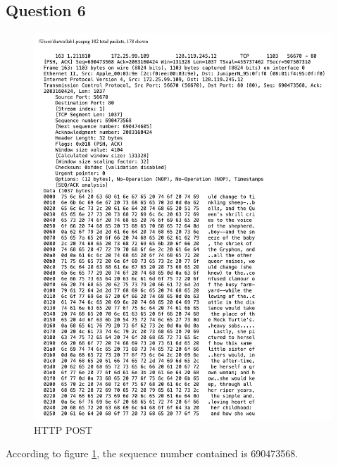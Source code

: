 \documentclass[titlepage, paper=a4, fontsize=11pt]{scrartcl} %
\numberwithin{equation}{section} %
\numberwithin{figure}{section} %
\numberwithin{table}{section} %
\begin{document}
\subsection*{Question 6}
\begin{figure}[!ht]
    \centering
    \includegraphics[width=\textwidth]{images/lab1-q6.pdf}
    \caption{HTTP POST}
    \label{fig:tcp-http-post}
\end{figure}
According to figure \ref{fig:tcp-http-post}, the sequence number contained is 690473568. \\
\end{document}

